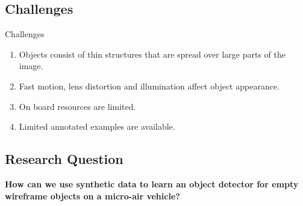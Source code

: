 \documentclass{beamer}
\begin{document}
\begin{darkframes}
\subsection{Challenges}    
\begin{frame}

\begin{block}{Challenges}
	\begin{enumerate}
		\item Objects consist of thin structures that are spread over large parts of the image.
		
		\item Fast motion, lens distortion and illumination affect object appearance.
		
		\item On board resources are limited.
		
		\item Limited annotated examples are available.
		
	\end{enumerate}
\end{block}
\end{frame}

	\subsection{Research Question}    
	\begin{frame}	
	\textbf{How can we use synthetic data to learn an object detector for empty wireframe objects on a micro-air vehicle?}
	

	\end{frame}

\end{darkframes}
\end{document}
